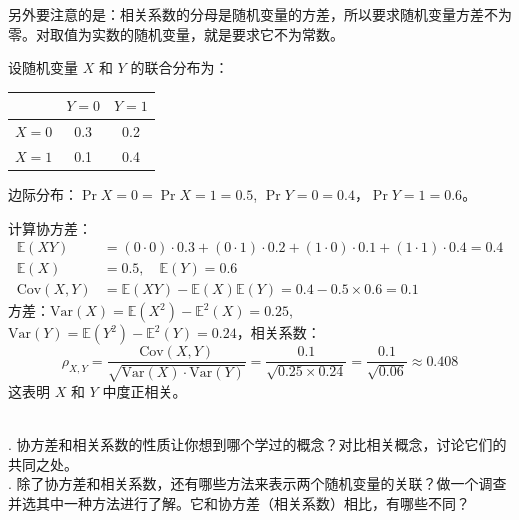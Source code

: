 \documentclass[12pt,UTF8,fontset=none]{ctexbook}
\begin{document}
另外要注意的是：相关系数的分母是随机变量的方差，所以要求随机变量方差不为零。对取值为实数的随机变量，就是要求它不为常数。

\begin{ex}
    设随机变量 \(X\) 和 \(Y\) 的联合分布为：
    \begin{center}
        \begin{tabular}{c|cc}
            & \(Y=0\) & \(Y=1\) \\ \hline
            \(X=0\) & 0.3 & 0.2 \\
            \(X=1\) & 0.1 & 0.4
        \end{tabular}
    \end{center}
    边际分布：\(\Pr{X=0}=\Pr{X=1}=0.5\), \(\Pr{Y=0}=0.4\)，\(\Pr{Y=1}=0.6\)。

    计算协方差：
    \begin{align*}
        \mathbb{E}(XY) &= (0\cdot0)\cdot0.3 + (0\cdot1)\cdot0.2 + (1\cdot0)\cdot0.1 + (1\cdot1)\cdot0.4 = 0.4 \\
        \mathbb{E}(X) &= 0.5,\quad \mathbb{E}(Y) = 0.6 \\
        \text{Cov}(X,Y) &= \mathbb{E}(XY) - \mathbb{E}(X)\mathbb{E}(Y) = 0.4 - 0.5 \times 0.6 = 0.1
    \end{align*}
    方差：\(\text{Var}(X) = \mathbb{E}(X^2) - \mathbb{E}^2(X)= 0.25\), \(\text{Var}(Y) = \mathbb{E}(Y^2) - \mathbb{E}^2(Y) = 0.24\)，相关系数：
    $$ \rho_{X,Y} = \frac{\text{Cov}(X,Y)}{\sqrt{\text{Var}(X)\cdot\text{Var}(Y)}} = \frac{0.1}{\sqrt{0.25 \times 0.24}} = \frac{0.1}{\sqrt{0.06}} \approx 0.408 $$
    这表明 \(X\) 和 \(Y\) 中度正相关。
\end{ex}

\begin{sk}
    \mbox{} \\
    . 协方差和相关系数的性质让你想到哪个学过的概念？对比相关概念，讨论它们的共同之处。\\
    . 除了协方差和相关系数，还有哪些方法来表示两个随机变量的关联？做一个调查并选其中一种方法进行了解。它和协方差（相关系数）相比，有哪些不同？
\end{sk}
\end{document}
